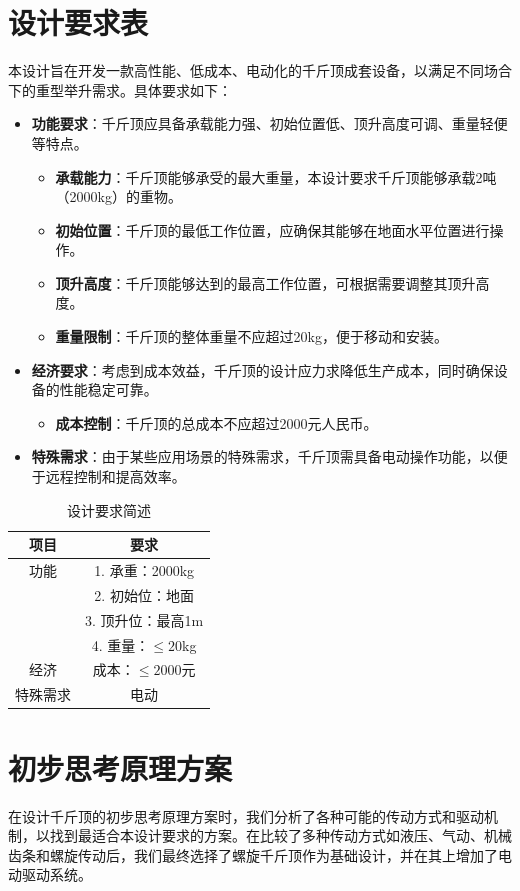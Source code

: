 \documentclass[12pt, a4paper, oneside]{ctexart}
\begin{document}
\section{设计要求表}
本设计旨在开发一款高性能、低成本、电动化的千斤顶成套设备，以满足不同场合下的重型举升需求。具体要求如下：
\begin{itemize}
  \item \textbf{功能要求}：千斤顶应具备承载能力强、初始位置低、顶升高度可调、重量轻便等特点。
    \begin{itemize}
    \item \textbf{承载能力}：千斤顶能够承受的最大重量，本设计要求千斤顶能够承载2吨（2000kg）的重物。
    \item \textbf{初始位置}：千斤顶的最低工作位置，应确保其能够在地面水平位置进行操作。
    \item \textbf{顶升高度}：千斤顶能够达到的最高工作位置，可根据需要调整其顶升高度。
    \item \textbf{重量限制}：千斤顶的整体重量不应超过20kg，便于移动和安装。
    \end{itemize}
  \item \textbf{经济要求}：考虑到成本效益，千斤顶的设计应力求降低生产成本，同时确保设备的性能稳定可靠。
    \begin{itemize}
    \item \textbf{成本控制}：千斤顶的总成本不应超过2000元人民币。
    \end{itemize}
  \item \textbf{特殊需求}：由于某些应用场景的特殊需求，千斤顶需具备电动操作功能，以便于远程控制和提高效率。
\end{itemize}

\begin{table}[htbp]
\centering
\begin{tabular}{|c|c|}
  \hline
\textbf{项目} & \textbf{要求} \\
\hline
功能 & 1. 承重：2000kg\\
     & 2. 初始位：地面\\
     & 3. 顶升位：最高1m\\
     & 4. 重量：$\leq20$kg \\
     \hline
经济 & 成本：$\leq2000$元 \\
\hline
特殊需求 & 电动 \\
\hline
\end{tabular}
\caption{设计要求简述}
\end{table}

\section{初步思考原理方案}
在设计千斤顶的初步思考原理方案时，我们分析了各种可能的传动方式和驱动机制，以找到最适合本设计要求的方案。在比较了多种传动方式如液压、气动、机械齿条和螺旋传动后，我们最终选择了螺旋千斤顶作为基础设计，并在其上增加了电动驱动系统。
\end{document}
